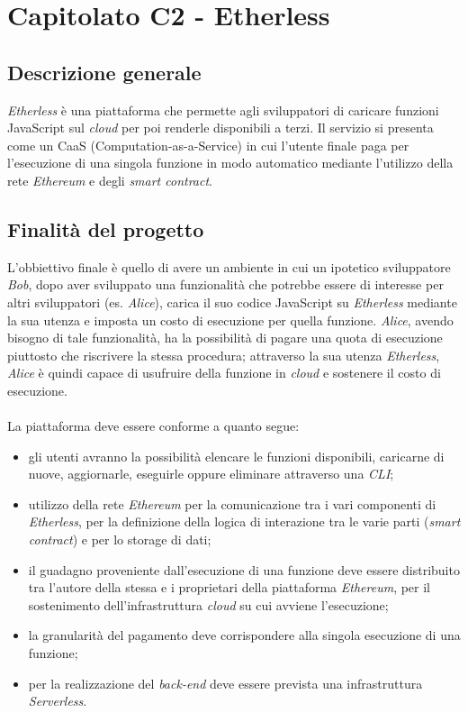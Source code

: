 \section{Capitolato C2 - Etherless}

\subsection{Descrizione generale}
\textit{Etherless} è una piattaforma che permette agli sviluppatori di caricare funzioni JavaScript sul \textit{cloud\glo} per poi renderle disponibili a terzi. Il servizio si presenta come un CaaS (Computation-as-a-Service) in cui l'utente finale paga per l'esecuzione di una singola funzione in modo automatico mediante l'utilizzo della rete \textit{Ethereum\glo} e degli \textit{smart contract\glos}. 
\subsection{Finalità del progetto}
L'obbiettivo finale è quello di avere un ambiente in cui un ipotetico sviluppatore \textit{Bob}, dopo aver sviluppato una funzionalità che potrebbe essere di interesse per altri sviluppatori (es. \textit{Alice}), carica il suo codice JavaScript su \textit{Etherless} mediante la sua utenza e imposta un costo di esecuzione per quella funzione. \textit{Alice}, avendo bisogno di tale funzionalità, ha la possibilità di pagare una quota di esecuzione piuttosto che riscrivere la stessa procedura; attraverso la sua utenza \textit{Etherless}, \textit{Alice} è quindi capace di usufruire della funzione in \textit{cloud\glo} e sostenere il costo di esecuzione.
\\\\
La piattaforma deve essere conforme a quanto segue:
\begin{itemize}
	\item gli utenti avranno la possibilità elencare le funzioni disponibili,  caricarne di nuove, aggiornarle, eseguirle oppure eliminare attraverso una \textit{CLI\glos};
	\item utilizzo della rete \textit{Ethereum\glo} per la comunicazione tra i vari componenti di \textit{Etherless}, per la definizione della logica di interazione tra le varie parti (\textit{smart contract\glos}) e per lo storage di dati;
	\item il guadagno proveniente dall'esecuzione di una funzione deve essere distribuito tra l'autore della stessa e i proprietari della piattaforma \textit{Ethereum\glos}, per il sostenimento dell'infrastruttura \textit{cloud\glo} su cui avviene l'esecuzione;
	\item la granularità del pagamento deve corrispondere alla singola esecuzione di una funzione;
	\item per la realizzazione del \textit{back-end\glo} deve essere prevista una infrastruttura \textit{Serverless\glos}.
\end{itemize}

